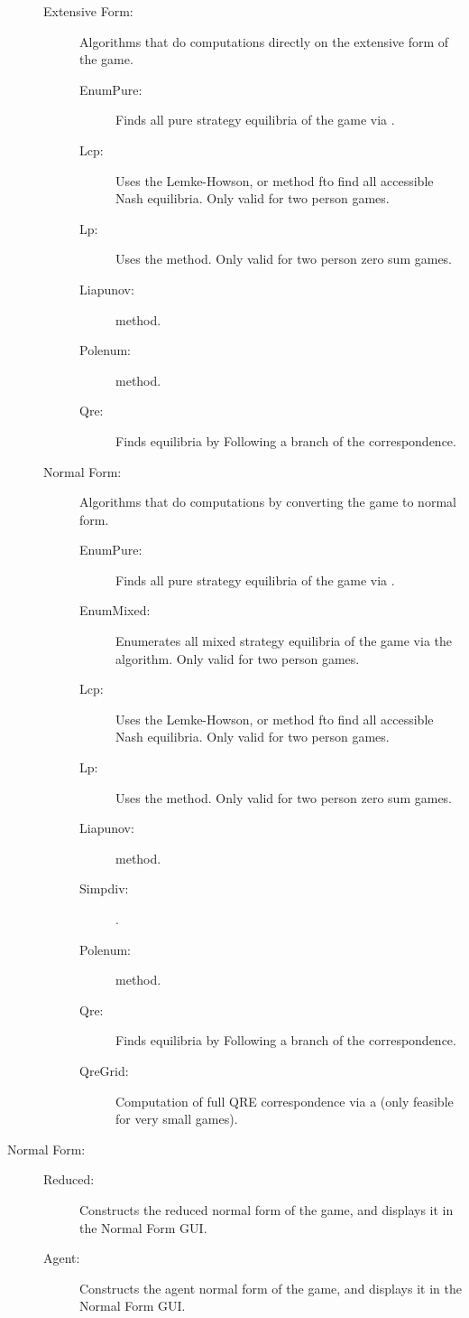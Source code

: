 \begin{description}
\begin{description}
\item[Extensive Form:] Algorithms that do computations directly on the extensive form of the game.  
\begin{description}
\item[EnumPure:] Finds all pure strategy equilibria of the game via 
.
\item[Lcp:] Uses the Lemke-Howson, or  method fto find all accessible Nash
equilibria. Only valid for two person games.
\item[Lp:] Uses the  method.  Only
valid for two person zero sum games.
\item[Liapunov:]  method.  
\item[Polenum:]  method.  
\item[Qre:] Finds equilibria by Following a branch of the  correspondence.
\end{description}
\item[Normal Form:] Algorithms that do computations by converting the
game to normal form. 
\begin{description}
\item[EnumPure:] Finds all pure strategy equilibria of the game via 
.
\item[EnumMixed:] Enumerates all mixed strategy equilibria of the
game via the  algorithm. Only valid for two
person games.
\item[Lcp:] Uses the Lemke-Howson, or  method fto find all accessible Nash
equilibria. Only valid for two person games.
\item[Lp:] Uses the  method.  Only
valid for two person zero sum games.
\item[Liapunov:]  method.  
\item[Simpdiv:] . 
\item[Polenum:]  method.  
\item[Qre:] Finds equilibria by Following a branch of the  correspondence.
\item[QreGrid:] Computation of full QRE correspondence via a 
 (only feasible for very small games).
\end{description}
\end{description}
\item[Normal Form:] 
\begin{description}
\item[Reduced:] Constructs the reduced normal form of the game, and
displays it in the Normal Form GUI.
\item[Agent:] Constructs the agent normal form of the game, and
displays it in the Normal Form GUI.
\end{description}
\end{description}

